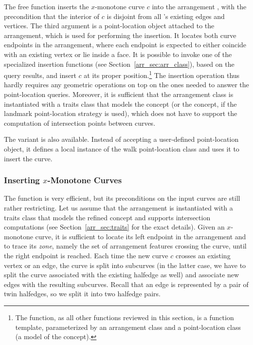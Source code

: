The free function 
inserts the $x$-monotone curve $c$ into the arrangement ,
with the precondition that the interior of $c$ is disjoint from
all 's existing edges and vertices. The third argument
 is a point-location object attached to the arrangement,
which is used for performing the insertion. It locates both curve
endpoints in the arrangement, where each endpoint is expected to
either coincide with an existing vertex or lie inside a face.
It is possible to invoke one of the specialized insertion functions
(see Section~\ref{arr_sec:arr_class}), based on the query results, and
insert $c$ at its proper position.\footnote{The
 function, as all other functions
reviewed in this section, is a function template, parameterized by an
arrangement class and a point-location class (a model of the
 concept).} The insertion operation
thus hardly requires any geometric operations on top on the ones
needed to answer the point-location queries. Moreover, it is
sufficient that the arrangement class is instantiated with a
traits class that models the 
concept (or the  concept, if the
landmark point-location strategy is used), which does not have to
support the computation of intersection points between curves.

The variant  is also
available. Instead of accepting a user-defined point-location
object, it defines a local instance of the walk point-location
class and uses it to insert the curve.

\subsubsection{Inserting $x$-Monotone Curves}
\label{arr_sssec:insert_x_mon}

The  function is very
efficient, but its preconditions on the input curves are still
rather restricting. Let us assume that the arrangement is
instantiated with a traits class that models the refined
 concept and supports
intersection computations (see Section~\ref{arr_sec:traits} for
the exact details). Given an $x$-monotone curve, it is sufficient
to locate its left endpoint in the arrangement and to trace its
{\em zone}, namely the set of arrangement features crossing the curve,
until the right endpoint is reached. Each time the new curve $c$
crosses an existing vertex or an edge, the curve is split into
subcurves (in the latter case, we have to split the curve 
associated with the existing halfedge as well) and associate new
edges with the resulting subcurves. Recall that an edge is represented
by a pair of twin halfedges, so we split it into two halfedge pairs.

